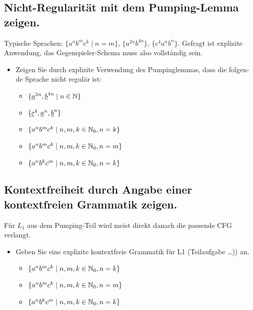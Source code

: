 \subsection{Nicht-Regularität mit dem Pumping-Lemma zeigen.} %
Typische Sprachen: $\{a^n b^m c^k\mid n=m\}$, $\{a^{2n}b^{4n}\}$, $\{c^4 a^n b^n\}$.
Gefragt ist explizite Anwendung, das Gegenspieler-Schema muss also vollständig sein.

\begin{itemize}
    \item Zeigen Sie durch explizite Verwendung des Pumpinglemmas, dass die folgen-
    de Sprache nicht regulär ist:
    \begin{itemize}
        \item $\{\underline{a}^{2n}, \underline{b}^{4n} \mid n \in \mathbb{N}\}$ 
        \item $\{ \underline{c}^4, \underline{a}^n, \underline{b}^n \}$ 
        \item $\{a^n b^m c^k \mid n,m,k \in \mathbb{N}_0, n = k \}$  
        \item $\{a^n b^m c^k \mid n,m,k \in \mathbb{N}_0, n = m \}$  
        \item $\{a^n b^k c^m \mid n,m,k \in \mathbb{N}_0, n = k\}$ 
    \end{itemize}
\end{itemize}

\subsection{Kontextfreiheit durch Angabe einer kontextfreien Grammatik zeigen.} %
Für $L_1$ aus dem Pumping-Teil wird meist direkt danach die passende CFG verlangt.

\begin{itemize}
    \item Geben Sie eine explizite kontextfreie Grammatik für L1 (Teilaufgabe \ldots)) an.
    \begin{itemize}
        \item $\{a^n b^m c^k \mid n,m,k \in \mathbb{N}_0, n = k \}$  
        \item $\{a^n b^m c^k \mid n,m,k \in \mathbb{N}_0, n = m \}$  
        \item  $\{a^n b^k c^m \mid n,m,k \in \mathbb{N}_0, n = k\}$ 
    \end{itemize}
\end{itemize}


